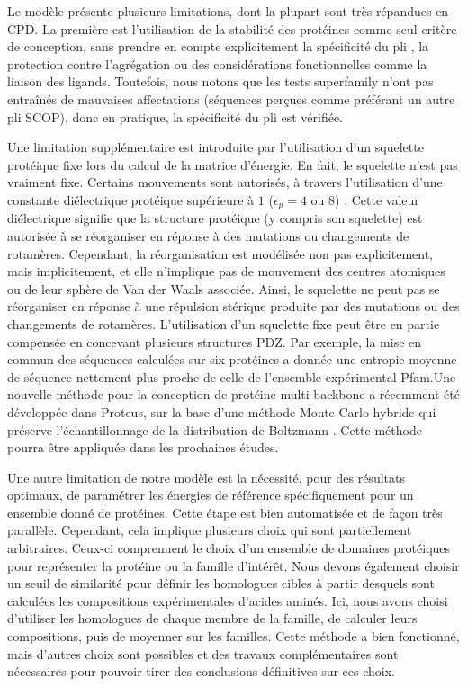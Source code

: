Le modèle présente plusieurs limitations, dont la plupart sont très répandues en CPD. La première est l'utilisation de la stabilité des protéines comme seul critère de conception, sans prendre en compte explicitement la spécificité du pli \cite{Schmidt08, Simonson13}, la protection contre l'agrégation ou des considérations fonctionnelles comme la liaison des ligands. Toutefois, nous notons que les tests superfamily n'ont pas entraînés de mauvaises affectations (séquences perçues comme préférant un autre pli SCOP), donc en pratique, la spécificité du pli est vérifiée.

Une limitation supplémentaire est introduite par l'utilisation d'un squelette protéique fixe lors du calcul de la matrice d'énergie. En fait, le squelette n'est pas vraiment fixe. Certains mouvements sont autorisés, à travers l'utilisation d'une constante diélectrique protéique supérieure à $1$ ($\epsilon_p= 4$ ou $8$) \cite{Simonson13}. Cette valeur diélectrique signifie que la structure protéique (y compris son squelette) est autorisée à se réorganiser en réponse à des mutations ou changements de rotamères. Cependant, la réorganisation est modélisée non pas explicitement, mais implicitement, et elle n'implique pas de mouvement des centres atomiques ou de leur sphère de Van der Waals associée. Ainsi, le squelette ne peut pas se réorganiser en réponse à une répulsion stérique produite par des mutations ou des changements de rotamères. L'utilisation d'un squelette fixe peut être en partie compensée en concevant plusieurs structures PDZ. Par exemple, la mise en commun des séquences calculées sur six protéines a donnée une entropie moyenne de séquence nettement plus proche de celle de l'ensemble expérimental  Pfam.Une nouvelle méthode pour la conception de protéine multi-backbone a récemment été développée dans Proteus, sur la base d'une méthode Monte Carlo hybride qui préserve l'échantillonnage de la distribution de Boltzmann \cite{Druart17}. Cette méthode pourra être appliquée dans les prochaines études.

Une autre limitation de notre modèle est la nécessité, pour des résultats optimaux, de paramétrer les énergies de référence spécifiquement pour un ensemble donné de protéines. Cette étape est bien automatisée et de façon très parallèle. Cependant, cela implique plusieurs choix qui sont partiellement arbitraires. Ceux-ci comprennent le choix d'un ensemble de domaines protéiques pour représenter la protéine ou la famille d'intérêt. Nous devons également choisir un seuil de similarité pour définir les homologues cibles à partir desquels sont calculées les compositions expérimentales d'acides aminés. Ici, nous avons choisi d'utiliser les homologues de chaque membre de la famille, de calculer leurs compositions, puis de moyenner sur les familles. Cette méthode a bien fonctionné, mais d'autres choix sont possibles et des travaux complémentaires sont nécessaires pour pouvoir tirer des conclusions définitives sur ces choix.

